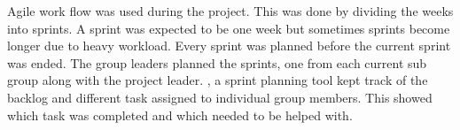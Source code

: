 


Agile work flow was used during the project. This was done by dividing the weeks into sprints. A sprint was expected to be one week but sometimes sprints become longer due to heavy workload. Every sprint was planned before the current sprint was ended. The group leaders planned the sprints, one from each current sub group along with the project leader. \taiga{}, a sprint planning tool kept track of the backlog and different task assigned to individual group members. This showed which task was completed and which needed to be helped with. 



